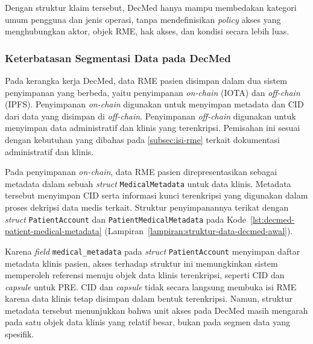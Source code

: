 Dengan struktur klaim tersebut, DecMed hanya mampu membedakan kategori umum pengguna dan jenis operasi, tanpa mendefinisikan \textit{policy} akses yang menghubungkan aktor, objek RME, hak akses, dan kondisi secara lebih luas.


\subsubsection{Keterbatasan Segmentasi Data pada DecMed}
\label{subsubsec:keterbatasan-segmentasi-data-decmed}

Pada kerangka kerja DecMed, data RME pasien disimpan dalam dua sistem penyimpanan yang berbeda, yaitu penyimpanan \textit{on-chain} (IOTA) dan \textit{off-chain} (IPFS). Penyimpanan \textit{on-chain} digunakan untuk menyimpan metadata dan CID dari data yang disimpan di \textit{off-chain}. Penyimpanan \textit{off-chain} digunakan untuk menyimpan data administratif dan klinis yang terenkripsi. Pemisahan ini sesuai dengan kebutuhan yang dibahas pada \ref{subsec:isi-rme} terkait dokumentasi administratif dan klinis.

Pada penyimpanan \textit{on-chain}, data RME pasien direpresentasikan sebagai metadata dalam sebuah \textit{struct} \texttt{MedicalMetadata} untuk data klinis. Metadata tersebut menyimpan CID serta informasi kunci terenkripsi yang digunakan dalam proses dekripsi data medis terkait. Struktur penyimpanannya terikat dengan \textit{struct} \texttt{PatientAccount} dan \texttt{PatientMedicalMetadata} pada Kode~\ref{lst:decmed-patient-medical-metadata} (Lampiran~\ref{lampiran:struktur-data-decmed-awal}).

Karena \textit{field} \texttt{medical\_metadata} pada \textit{struct} \texttt{PatientAccount} menyimpan daftar metadata klinis pasien, akses terhadap struktur ini memungkinkan sistem memperoleh referensi menuju objek data klinis terenkripsi, seperti CID dan \textit{capsule} untuk PRE. CID dan \textit{capsule} tidak secara langsung membuka isi RME karena data klinis tetap disimpan dalam bentuk terenkripsi. Namun, struktur metadata tersebut menunjukkan bahwa unit akses pada DecMed masih mengarah pada satu objek data klinis yang relatif besar, bukan pada segmen data yang spesifik.

